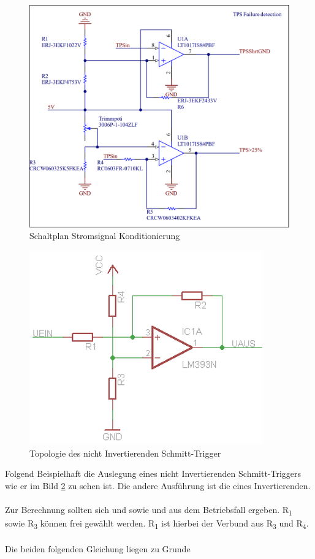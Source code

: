 \begin{figure}
	\centering
	\includegraphics[width=0.7\linewidth]{"bilder/TPS Failure detection"}
	\caption{Schaltplan Stromsignal Konditionierung}
	\label{fig:tps-failure-detection}
\end{figure}

\begin{figure}
	\centering
	\includegraphics[width=0.5\linewidth]{"bilder/nichtinvertierender Trigger"}
	\caption{Topologie des nicht Invertierenden Schmitt-Trigger}
	\label{fig:nichtinvertierender-trigger}
\end{figure}

Folgend Beispielhaft die Auslegung eines nicht Invertierenden Schmitt-Triggers wie er im Bild \ref{fig:nichtinvertierender-trigger} zu sehen ist. Die andere Ausführung ist die eines Invertierenden.
\\
\\
Zur Berechnung sollten sich  und  sowie  und  aus dem Betriebsfall ergeben. R\textsubscript{1} sowie R\textsubscript{3} können frei gewählt werden. R\textsubscript{1} ist hierbei der Verbund aus R\textsubscript{3} und R\textsubscript{4}.
\\
\\
Die beiden folgenden Gleichung liegen zu Grunde

